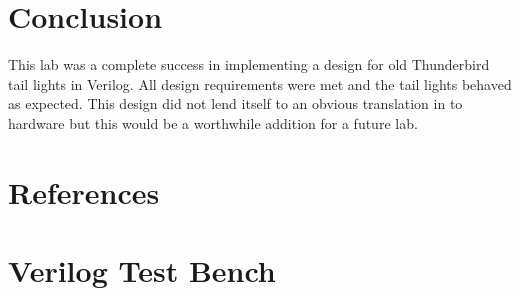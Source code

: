 \documentclass[12pt]{article}
\begin{document}

\section{Conclusion}

This lab was a complete success in implementing a design for
old Thunderbird tail lights in Verilog.
All design requirements were met and the tail lights behaved as
expected.
This design did not lend itself to an obvious translation in to
hardware but this would be a worthwhile addition for a future lab.



\renewcommand*{\refname}{\vspace{-8mm}}
\section{References}



\clearpage
\appendix

\section{Verilog Test Bench}
\label{sec:test}


\end{document}
